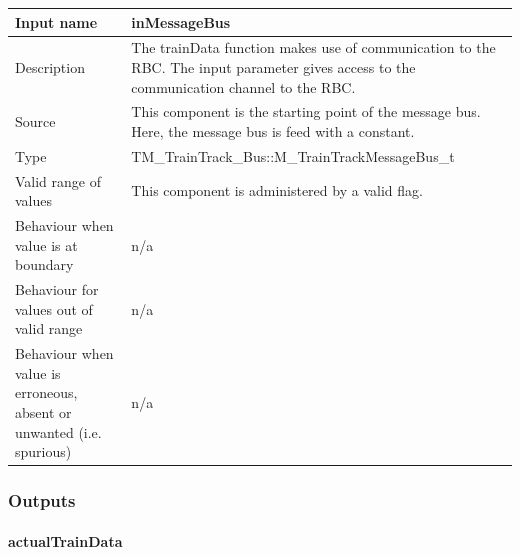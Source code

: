 \begin{longtable}{p{}p{}}
\toprule
Input name				& inMessageBus\\
\midrule
Description				& The trainData function makes use of communication to the RBC. The input parameter gives access to the communication channel to the RBC.
\\
\midrule
Source					& This component is the starting point of the message bus. Here, the message bus is feed with a constant.\\  
\midrule
Type					& TM\_TrainTrack\_Bus::M\_TrainTrackMessageBus\_t\\
\midrule
Valid range of values	& This component is administered by a valid flag.\\
\midrule
Behaviour when value is at boundary	& n/a\\
\midrule
Behaviour for values out of valid range	& n/a\\
\midrule
Behaviour when value is erroneous, absent or unwanted (i.e. spurious) & n/a\\
\bottomrule
\end{longtable}

\subsubsection{Outputs}\label{s:traindata_outputs}

\paragraph{actualTrainData}

